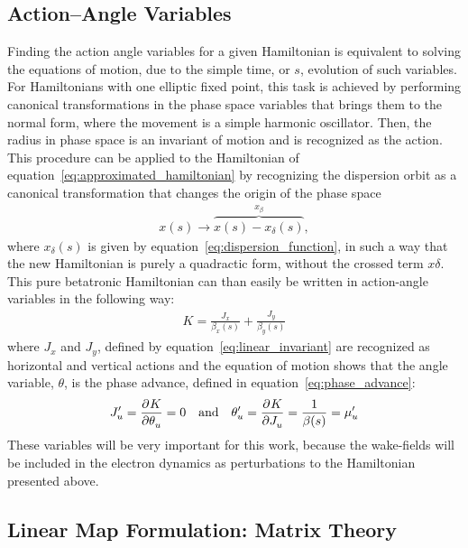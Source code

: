 \subsection{Action--Angle Variables}

    Finding the action angle variables for a given Hamiltonian is equivalent to solving the equations of motion, due to the simple time, or $s$, evolution of such variables. For  Hamiltonians with one elliptic fixed point, this task is achieved by performing canonical transformations in the phase space variables that brings them to the normal form, where the movement is a simple harmonic oscillator. Then, the radius in phase space is an invariant of motion and is recognized as the action. This procedure can be applied to the Hamiltonian of equation~\eqref{eq:approximated_hamiltonian} by recognizing the dispersion orbit as a canonical transformation that changes the origin of the phase space~\cite[Appendix A2]{Berg1996}
    \begin{align}\label{eq:off_momentum_canonical_transformation}
        x (s) \to \overbrace{x(s) - x_\delta (s)}^{x_\beta},
    \end{align}
    where $x_\delta (s)$ is given by equation~\eqref{eq:dispersion_function}, in such a way that the new Hamiltonian is purely a quadractic form, without the crossed term $x\delta$. This pure betatronic Hamiltonian can than easily be written in action-angle variables in the following way:
    \begin{align}\label{eq:betatron_hamiltonian}
        K = \frac{J_x}{\beta_x(s)} + \frac{J_y}{\beta_y(s)}
    \end{align}
    where $J_x$ and $J_y$, defined by equation~\eqref{eq:linear_invariant} are recognized as horizontal and vertical actions and the equation of motion shows that the angle variable, $\theta$, is the phase advance, defined in equation~\eqref{eq:phase_advance}:
    \begin{align}
        J'_u = \frac{\partial^{{}}K}{\partial \theta_u^{{}}} = 0 \quad \text{and} \quad \theta'_u = \frac{\partial^{{}}K}{\partial J_u^{{}}} = \frac{1}{\beta(s)} = \mu'_u
    \end{align}
    These variables will be very important for this work, because the wake-fields will be included in the electron dynamics as perturbations to the Hamiltonian presented above.

\subsection{Linear Map Formulation: Matrix Theory}

